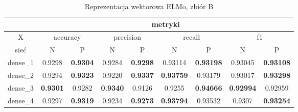 \begin{table}[p] \centering
    \caption{Reprezentacja wektorowa ELMo, zbiór B}
    \label{tab:wyniki_elmo_B}
    \begin{tabular} {|c|c|c|c|c|c|c|c|c| }    \hline
                 & \multicolumn{8}{c|}{metryki}                                                                                                                                                                                                                                                            \\ \hline
        X        & \multicolumn{2}{c|}{accuracy}       & \multicolumn{2}{c|}{precision}      & \multicolumn{2}{c|}{recall} & \multicolumn{2}{c|}{f1}                                                                                                                                                       \\ \hline
        sieć     & N                                   & P                                   & N                           & P                                   & N                           & P                                    & N                                    & P                           \\ \hline
        dense\_1 & 0.9298                              & \textbf{0.9304}                     & 0.9284                      & \textbf{0.9298}                     & 0.93114                     & \textbf{0.93198}                     & 0.93045                              & \textbf{0.93108}            \\ \hline
        dense\_2 & 0.9294                              & \textbf{0.9323}                     & 0.9220                      & \textbf{0.9337}                     & \textbf{0.93759}            & 0.93179                              & 0.93017                              & \textbf{0.93298}            \\ \hline
        dense\_3 & \textbf{0.9301}                     & 0.9282                              & \textbf{0.9340}             & 0.9126                              & 0.9255                      & \textbf{0.94666}                     & \textbf{0.92994}                     & 0.92959                     \\ \hline
        dense\_4 & 0.9297                              & \textbf{0.9319}                     & 0.9234                      & \textbf{0.9273}                     & \textbf{0.93794}            & 0.93532                              & 0.9307                               & \textbf{0.93254}            \\ \hline

\end{tabular}
\end{table}
